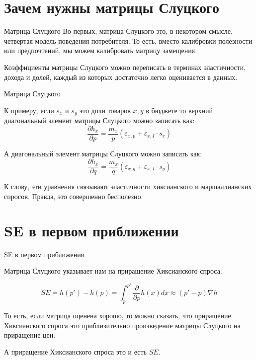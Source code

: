 \documentclass{beamer}
\begin{document}
\section{Зачем нужны матрицы Слуцкого}

\begin{frame}{Матрица Слуцкого}
Во первых, матрица Слуцкого это, в некотором смысле, четвертая модель поведения потребителя. То есть, вместо калибровки полезности или предпочтений, мы можем калибровать матрицу замещения. 

Коэффициенты матрицы Слуцкого можно переписать в терминах эластичности, дохода и долей, каждый из которых достаточно легко оценивается в данных. 
\end{frame}

\begin{frame}{Матрица Слуцкого}

К примеру, если $s_x$ и $s_y$ это доли товаров $x, y$ в бюджете то верхний диагональный элемент матрицы Слуцкого можно записать как:
$$ \frac{\partial h_x}{\partial p} = \frac{m_x}{p} (\varepsilon_{x,p} + \varepsilon_{x,I} \cdot s_x)$$

А диагональный элемент матрицы Слуцкого можно записать как:
$$ \frac{\partial h_x}{\partial q} = \frac{m_x}{q} (\varepsilon_{x,q} + \varepsilon_{x,I} \cdot s_y)$$

К слову, эти уравнения связывают эластичности хиксианского и маршаллианских спросов. Правда, это совершенно бесполезно.

\end{frame}

\section{SE в первом приближении}

\begin{frame}{SE в первом приближении}

Матрица Слуцкого указывает нам на приращение Хиксианского спроса. 

\begin{lemma}
$$ SE = h(p') - h(p) = \int_p^{p'} \frac{\partial}{\partial p} h(x) dx \approx (p'-p) \nabla h$$	
\end{lemma}

То есть, если матрица оценена хорошо, то можно сказать, что приращение Хиксианского спроса это приблизительно произведение матрицы Слуцкого на приращение цен. 

А приращение Хиксианского спроса это и есть $SE$.

\end{frame}
\end{document}

